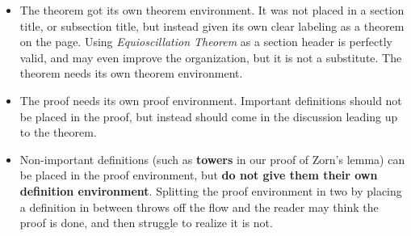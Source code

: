 \documentclass{article}
\theoremstyle{normal}
\begin{document}
        \begin{itemize}
            \item
                The theorem got its own theorem environment. It was not
                placed in a section title, or subsection title, but instead
                given its own clear labeling as a theorem on the page. Using
                \textit{Equioscillation Theorem} as a section header is
                perfectly valid, and may even improve the organization, but it
                is not a substitute. The theorem needs its own theorem
                environment.
            \item
                The proof needs its own proof environment. Important definitions
                should not be placed in the proof, but instead should come in
                the discussion leading up to the theorem.
            \item
                Non-important definitions (such as \textbf{towers} in our
                proof of Zorn's lemma) can be placed in the proof environment,
                but \textbf{do not give them their own definition environment}.
                Splitting the proof environment in two by placing a definition
                in between throws off the flow and the reader may think the
                proof is done, and then struggle to realize it is not.
        \end{itemize}
\end{document}

